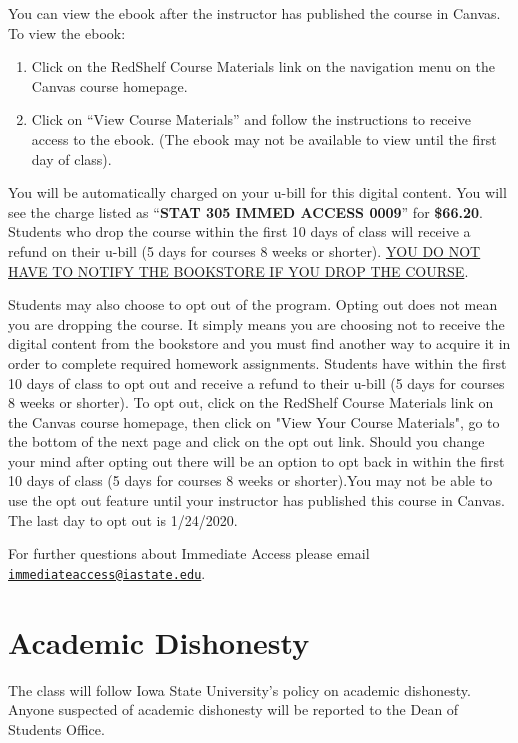 \documentclass{article}
\begin{document}
You can view the ebook after the instructor has published the course in Canvas. To view the ebook: 
 
\begin{enumerate}
	\item	Click on the RedShelf Course Materials link on the navigation menu on the Canvas course homepage.
	\item Click on “View Course Materials” and follow the instructions to receive access to the ebook. (The ebook may not be available to view until the first day of class). 
\end{enumerate}
 
You will be automatically charged on your u-bill for this digital content. You
will see the charge listed as “{\bf STAT 305 IMMED ACCESS 0009}” for {\bf
\$66.20}. Students who drop the course within the first 10 days of class will
receive a refund on their u-bill (5 days for courses 8 weeks or shorter).
\ul{YOU DO NOT HAVE TO NOTIFY THE BOOKSTORE IF YOU DROP  
THE COURSE}.
 
Students may also choose to opt out of the program. Opting out does not mean you are dropping the course. It simply means you are choosing not to receive the digital content from the bookstore and you must find another way to acquire it in order to complete required homework assignments. Students have within the first 10 days of class to opt out and receive a refund to their u-bill (5 days for courses 8 weeks or shorter).
To opt out, click on the RedShelf Course Materials link on the Canvas course homepage, then click on "View Your Course Materials", go to the bottom of the next page and click on the opt out link. Should you change your mind after opting out there will be an option to opt back in within the first 10 days of class (5 days for courses 8 weeks or shorter).You may not be able to use the opt out feature until your instructor has published this course in Canvas. The last day to opt out is 1/24/2020.
 
For further questions about Immediate Access please email
\href{mailto: immediateaccess@iastate.edu}{\tt immediateaccess@iastate.edu}.

\section{Academic Dishonesty}
The class will follow Iowa State University’s policy on academic dishonesty. Anyone suspected of
academic dishonesty will be reported to the Dean of Students Office.
\end{document}
